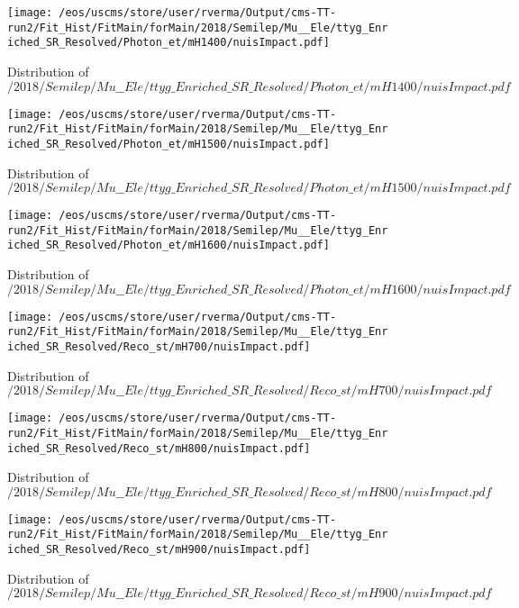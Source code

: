 \begin{figure}
\centering
\texttt{[image: /eos/uscms/store/user/rverma/Output/cms-TT-run2/Fit\_Hist/FitMain/forMain/2018/Semilep/Mu\_\_Ele/ttyg\_Enriched\_SR\_Resolved/Photon\_et/mH1400/nuisImpact.pdf]}
\caption{Distribution of $/2018/Semilep/Mu\_\_Ele/ttyg\_Enriched\_SR\_Resolved/Photon\_et/mH1400/nuisImpact.pdf$}
\end{figure}

\begin{figure}
\centering
\texttt{[image: /eos/uscms/store/user/rverma/Output/cms-TT-run2/Fit\_Hist/FitMain/forMain/2018/Semilep/Mu\_\_Ele/ttyg\_Enriched\_SR\_Resolved/Photon\_et/mH1500/nuisImpact.pdf]}
\caption{Distribution of $/2018/Semilep/Mu\_\_Ele/ttyg\_Enriched\_SR\_Resolved/Photon\_et/mH1500/nuisImpact.pdf$}
\end{figure}

\begin{figure}
\centering
\texttt{[image: /eos/uscms/store/user/rverma/Output/cms-TT-run2/Fit\_Hist/FitMain/forMain/2018/Semilep/Mu\_\_Ele/ttyg\_Enriched\_SR\_Resolved/Photon\_et/mH1600/nuisImpact.pdf]}
\caption{Distribution of $/2018/Semilep/Mu\_\_Ele/ttyg\_Enriched\_SR\_Resolved/Photon\_et/mH1600/nuisImpact.pdf$}
\end{figure}

\begin{figure}
\centering
\texttt{[image: /eos/uscms/store/user/rverma/Output/cms-TT-run2/Fit\_Hist/FitMain/forMain/2018/Semilep/Mu\_\_Ele/ttyg\_Enriched\_SR\_Resolved/Reco\_st/mH700/nuisImpact.pdf]}
\caption{Distribution of $/2018/Semilep/Mu\_\_Ele/ttyg\_Enriched\_SR\_Resolved/Reco\_st/mH700/nuisImpact.pdf$}
\end{figure}

\begin{figure}
\centering
\texttt{[image: /eos/uscms/store/user/rverma/Output/cms-TT-run2/Fit\_Hist/FitMain/forMain/2018/Semilep/Mu\_\_Ele/ttyg\_Enriched\_SR\_Resolved/Reco\_st/mH800/nuisImpact.pdf]}
\caption{Distribution of $/2018/Semilep/Mu\_\_Ele/ttyg\_Enriched\_SR\_Resolved/Reco\_st/mH800/nuisImpact.pdf$}
\end{figure}

\begin{figure}
\centering
\texttt{[image: /eos/uscms/store/user/rverma/Output/cms-TT-run2/Fit\_Hist/FitMain/forMain/2018/Semilep/Mu\_\_Ele/ttyg\_Enriched\_SR\_Resolved/Reco\_st/mH900/nuisImpact.pdf]}
\caption{Distribution of $/2018/Semilep/Mu\_\_Ele/ttyg\_Enriched\_SR\_Resolved/Reco\_st/mH900/nuisImpact.pdf$}
\end{figure}

